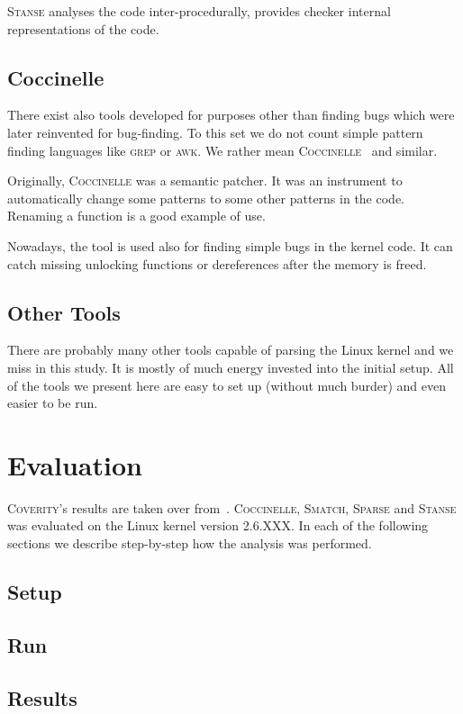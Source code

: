 \documentclass[10pt]{llncs}
\newcommand{\COC}{\textsc{Coccinelle}\xspace}
\newcommand{\COV}{\textsc{Coverity}\xspace}
\newcommand{\SM}{\textsc{Smatch}\xspace}
\newcommand{\SP}{\textsc{Sparse}\xspace}
\newcommand{\ST}{\textsc{Stanse}\xspace}
\begin{document}
\ST analyses the code inter-procedurally, provides checker internal
representations of the code.

\subsection{Coccinelle}
There exist also tools developed for purposes other than finding bugs which
were later reinvented for bug-finding. To this set we do not count simple
pattern finding languages like \textsc{grep} or \textsc{awk}. We rather mean
\COC~\cite{coccinelle} and similar.

Originally, \COC was a semantic patcher. It was an instrument to automatically
change some patterns to some other patterns in the code.  Renaming a function
is a good example of use.

Nowadays, the tool is used also for finding simple bugs in the kernel code. It
can catch missing unlocking functions or dereferences after the memory is
freed.

\subsection{Other Tools}
There are probably many other tools capable of parsing the Linux kernel and we
miss in this study. It is mostly of much energy invested into the initial
setup. All of the tools we present here are easy to set up (without much
burder) and even easier to be run.

\section{Evaluation}
\label{sec:results}
\COV's results are taken over from~\cite{billion}. \COC, \SM, \SP and \ST was
evaluated on the Linux kernel version 2.6.XXX. In each of the following
sections we describe step-by-step how the analysis was performed.

\subsection{Setup}

\subsection{Run}

\subsection{Results}
\end{document}
